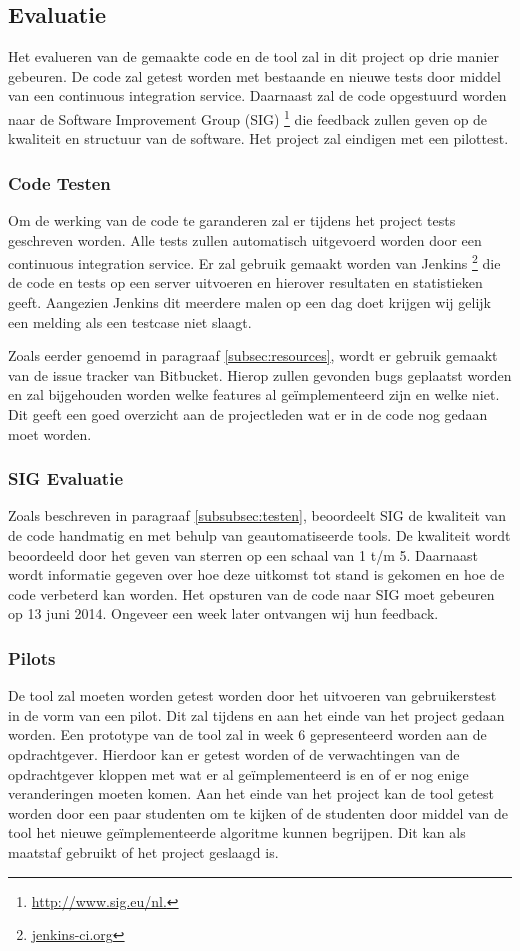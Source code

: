 \subsection{Evaluatie}
Het evalueren van de gemaakte code en de tool zal in dit project op drie manier gebeuren. De code zal getest worden met bestaande en nieuwe tests door middel van een continuous integration service. Daarnaast zal de code opgestuurd worden naar de Software Improvement Group (SIG) \footnote{\url{http://www.sig.eu/nl.}} die feedback zullen geven op de kwaliteit en structuur van de software. Het project zal eindigen met een pilottest.

\subsubsection{Code Testen}
Om de werking van de code te garanderen zal er tijdens het project tests geschreven worden. Alle tests zullen automatisch uitgevoerd worden door een continuous integration service. Er zal gebruik gemaakt worden van Jenkins \footnote{\url{jenkins-ci.org}} die de code en tests op een server uitvoeren en hierover resultaten en statistieken geeft. Aangezien Jenkins dit meerdere malen op een dag doet krijgen wij gelijk een melding als een testcase niet slaagt.

Zoals eerder genoemd in paragraaf \ref{subsec:resources}, wordt er gebruik gemaakt van de issue tracker van Bitbucket. Hierop zullen gevonden bugs geplaatst worden en zal bijgehouden worden welke features al ge\"implementeerd zijn en welke niet. Dit geeft een goed overzicht aan de projectleden wat er in de code nog gedaan moet worden.

\subsubsection{SIG Evaluatie}
Zoals beschreven in paragraaf \ref{subsubsec:testen}, beoordeelt SIG de kwaliteit van de code handmatig en met behulp van geautomatiseerde tools. De kwaliteit wordt beoordeeld door het geven van sterren op een schaal van 1 t/m 5. Daarnaast wordt informatie gegeven over hoe deze uitkomst tot stand is gekomen en hoe de code verbeterd kan worden. Het opsturen van de code naar SIG moet gebeuren op 13 juni 2014. Ongeveer een week later ontvangen wij hun feedback.

\subsubsection{Pilots}
De tool zal moeten worden getest worden door het uitvoeren van gebruikerstest in de vorm van een pilot. Dit zal tijdens en aan het einde van het project gedaan worden. Een prototype van de tool zal in week 6 gepresenteerd worden aan de opdrachtgever. Hierdoor kan er getest worden of de verwachtingen van de opdrachtgever kloppen met wat er al ge\"implementeerd is en of er nog enige veranderingen moeten komen. Aan het einde van het project kan de tool getest worden door een paar studenten om te kijken of de studenten door middel van de tool het nieuwe ge\"implementeerde algoritme kunnen begrijpen. Dit kan als maatstaf gebruikt of het project geslaagd is.
